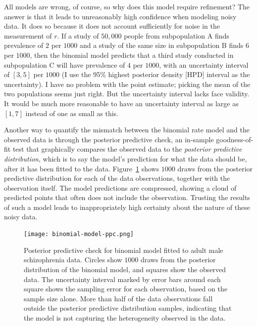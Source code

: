 All models are wrong, of course, so why does this model require
refinement? The answer is that it leads to unreasonably high
confidence when modeling noisy data.  It does so because it does not
account sufficiently for noise in the measurement of $r$. If a study
of $50,000$ people from subpopulation A finds prevalence of $2$ per
$1000$ and a study of the same size in subpopulation B finds $6$ per
$1000$, then the binomial model predicts that a third study conducted
in subpopulation C will have prevalence of $4$ per $1000$, with an
uncertainty interval of $[3,5]$ per $1000$ (I use the 95\% highest
posterior density [HPD] interval as the uncertainty).  I have no
problem with the point estimate; picking the mean of the two
populations seems just right.  But the uncertainty interval lacks face
validity.  It would be much more reasonable to have an uncertainty
interval as large as $[1,7]$ instead of one as small as this.

Another way to quantify the mismatch between the binomial rate model
and the observed data is through the posterior predictive check, an
in-sample goodness-of-fit test that graphically compares the observed
data to the \emph{posterior predictive distribution}, which is to say
the model's prediction for what the data should be, after it has been
fitted to the data.\cite{gelman_bayesian_2003}
Figure~\ref{rate-model-binom-ppc} shows $1000$ draws from the
posterior predictive distribution for each of the data observations,
together with the observation itself.  The model predictions are
compressed, showing a cloud of predicted points that often does not
include the observation.  Trusting the results of such a model leads
to inappropriately high certainty about the nature of these noisy data.

\begin{figure}[ht]
\begin{center}
\texttt{[image: binomial-model-ppc.png]}
\caption{Posterior predictive check for binomial model fitted to adult
  male schizophrenia data.  Circles show $1000$ draws from
  the posterior distribution of the binomial model, and squares
  show the observed data.  The uncertainty interval marked by error
  bars around each square shows the sampling error for each
  observation, based on the sample size alone. More than half of the
  data observations fall outside the posterior predictive distribution
  samples, indicating that the model is not capturing the
  heterogeneity observed in the data.}
\label{rate-model-binom-ppc}
\end{center}
\end{figure}


